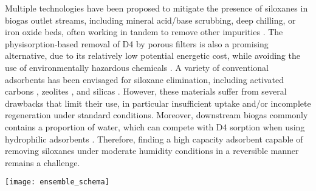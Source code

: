 Multiple technologies have been proposed to mitigate the presence of siloxanes
in biogas outlet streams, including mineral acid/base scrubbing, deep chilling,
or iron oxide beds, often working in tandem to remove other impurities
\citep{kuhnRequirementsTechniquesCosts2017}. The physisorption-based removal of
D4 by porous filters is also a promising alternative, due to its relatively low
potential energetic cost, while avoiding the use of environmentally hazardous
chemicals \citep{chinStatisticalAnalysisTrace2020,
ajharSiloxaneRemovalLandfill2010}. A variety of conventional adsorbents has been
envisaged for siloxane elimination, including activated carbons
\citep{finocchioDecompositionHexamethylcyclotrisiloxaneSolid2008}, zeolites
\citep{montanariPurificationLandfillBiogases2010}, and silicas
\citep{sigotAdsorptionOctamethylcyclotetrasiloxaneD42015}. However, these
materials suffer from several drawbacks that limit their use, in particular
insufficient uptake and/or incomplete regeneration under standard conditions.
Moreover, downstream biogas commonly contains a proportion of water, which can
compete with D4 sorption when using hydrophilic adsorbents
\citep{kuhnRequirementsTechniquesCosts2017,schweigkoflerRemovalSiloxanesBiogases2001}.
Therefore, finding a high capacity adsorbent capable of removing siloxanes under
moderate humidity conditions in a reversible manner remains a challenge.

\begin{widefigure}[htb]
    \centering
    \texttt{[image: ensemble\_schema]}
    \caption{%
        Workflow of the strategy applied to identify the best MOFs for
        D4 adsorption, narrowing down candidates from top to bottom through
        synergistic computational (left) and experimental (right) actions. The
        final MOF candidate, PCN-777, is highlighted.
    }\label{fig:overview}
\end{widefigure}

